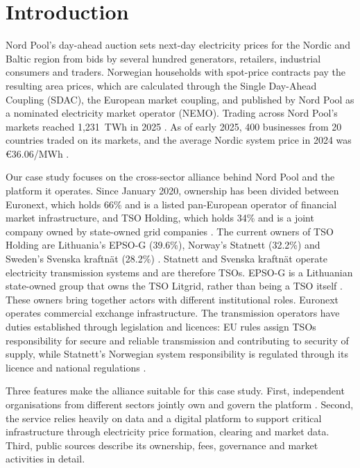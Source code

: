 \section{Introduction}
\label{sec:intro}

Nord Pool's day-ahead auction sets next-day electricity prices for the Nordic and Baltic region from bids by several hundred generators, retailers, industrial consumers and traders. Norwegian households with spot-price contracts pay the resulting area prices, which are calculated through the Single Day-Ahead Coupling (SDAC), the European market coupling, and published by Nord Pool as a nominated electricity market operator (NEMO). Trading across Nord Pool's markets reached 1,231~TWh in 2025 \citep{NPNewsletter2026}. As of early 2025, 400 businesses from 20 countries traded on its markets, and the average Nordic system price in 2024 was €36.06/MWh \citep{NP2024}.

Our case study focuses on the cross-sector alliance behind Nord Pool and the platform it operates. Since January 2020, ownership has been divided between Euronext, which holds 66\% and is a listed pan-European operator of financial market infrastructure, and TSO Holding, which holds 34\% and is a joint company owned by state-owned grid companies \citep{Euronext2020,NPAbout}. The current owners of TSO Holding are Lithuania's EPSO-G (39.6\%), Norway's Statnett (32.2\%) and Sweden's Svenska kraftnät (28.2\%) \citep{NPAbout}. Statnett and Svenska kraftnät operate electricity transmission systems and are therefore TSOs. EPSO-G is a Lithuanian state-owned group that owns the TSO Litgrid, rather than being a TSO itself \citep{EPSOGAbout}. These owners bring together actors with different institutional roles. Euronext operates commercial exchange infrastructure. The transmission operators have duties established through legislation and licences: EU rules assign TSOs responsibility for secure and reliable transmission and contributing to security of supply, while Statnett's Norwegian system responsibility is regulated through its licence and national regulations \citep{EU2019944,NVESystemOperation}.

Three features make the alliance suitable for this case study. First, independent organisations from different sectors jointly own and govern the platform \citep{NPAbout,NPBoard}. Second, the service relies heavily on data and a digital platform to support critical infrastructure through electricity price formation, clearing and market data. Third, public sources describe its ownership, fees, governance and market activities in detail.

